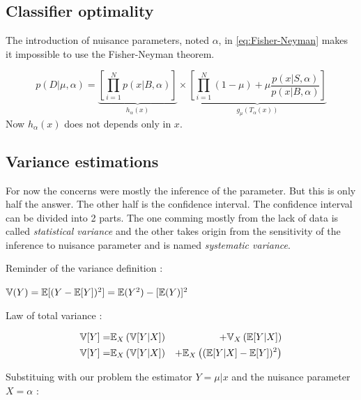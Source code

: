 





\subsection{Classifier optimality} %
\label{sub:classifier_optimality}


The introduction of nuisance parameters, noted $\alpha$, in \autoref{eq:Fisher-Neyman} makes it impossible to use the Fisher-Neyman theorem.

\begin{equation}
	p(D|\mu, \alpha) = \underbrace{\left[ \prod_{i=1}^N p(x|B, \alpha) \right ]}_{h_\alpha(x)} \times 
       \underbrace{\left [\prod_{i=1}^N (1-\mu) + \mu \frac{p(x|S, \alpha)}{p(x|B, \alpha)} \right ]}_{g_\mu(T_\alpha(x))}
\end{equation}
Now $h_\alpha(x)$ does not depends only in $x$.





\subsection{Variance estimations} %
\label{sub:variance_estimations}

For now the concerns were mostly the inference of the parameter.
But this is only half the answer.
The other half is the confidence interval.
The confidence interval can be divided into 2 parts.
The one comming mostly from the lack of data is called \emph{statistical variance} and the other takes origin from the sensitivity of the inference to nuisance parameter and is named \emph{systematic variance}.

Reminder of the variance definition :

$\mathbb{V}(Y) = \mathbb{E}[(Y - \mathbb{E}[Y])^2] = \mathbb{E}(Y^2) - [\mathbb{E}(Y)]^2$

Law of total variance \needcite :

\begin{eqnarray}
\label{eq:total_variance_law}
    \mathbb{V}[Y] =& \mathbb{E}_X \left (\mathbb{V}[Y|X] \right ) &+ \mathbb{V}_X \left (\mathbb{E}[Y|X]\right ) \\
    \mathbb{V}[Y] =& \mathbb{E}_X \left (\mathbb{V}[Y|X] \right ) &+ \mathbb{E}_X \left ( (\mathbb{E} [Y|X]  - \mathbb{E}[Y])^2\right )
\end{eqnarray}


Substituing with our problem the estimator $Y = \mu|x$ and the nuisance parameter $X = \alpha$ :

